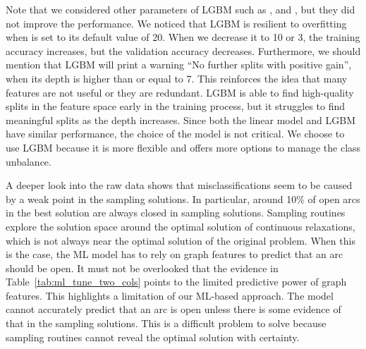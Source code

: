 \documentclass[3p, authoryear, times, doubleblind]{elsarticle}
\begin{document}
{Note that we considered other parameters of LGBM such as  ,  and , but they did not improve the performance. We noticed that LGBM is resilient to overfitting when  is set to its default value of 20. When we decrease it to 10 or 3, the training accuracy increases, but the validation accuracy decreases. Furthermore, we should mention that LGBM will print a warning ``No further splits with positive gain'', when its depth is higher than or equal to 7. This reinforces the idea that many features are not useful or they are redundant.  LGBM is able to find high-quality splits in the feature space early in the training process, but it struggles to find meaningful splits as the depth increases. Since both the linear model and LGBM have similar performance, the choice of the model is not critical. We choose to use LGBM because it is more flexible and offers more options to manage the class unbalance.

A deeper look into the raw data shows that misclassifications seem to be caused by a weak point in the sampling solutions. In particular, around 10\% of open arcs in the best solution are always closed in sampling solutions. Sampling routines explore the solution space around the optimal solution of continuous relaxations, which is not always near the optimal solution of the original problem. When this is the case, the ML model has to rely on graph features to predict that an arc should be open. It must not be overlooked that the evidence in Table~\ref{tab:ml_tune_two_cols} points to the limited predictive power of graph features. This highlights a limitation of our ML-based approach. The model cannot accurately predict that an arc is open unless there is some evidence of that in the sampling solutions. This is a difficult problem to solve because sampling routines cannot reveal the optimal solution with certainty. 

}
\end{document}
